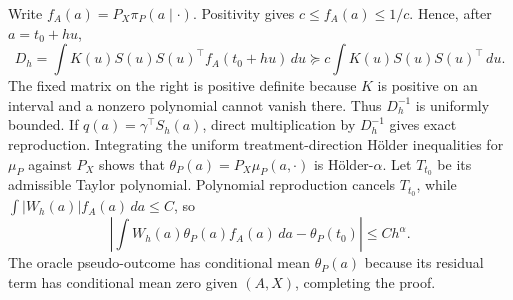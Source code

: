 Write \(f_A(a)=P_X\pi_P(a\mid\cdot)\). Positivity gives \(c\le f_A(a)\le1/c\). Hence, after \(a=t_0+hu\),
\[
D_h=\int K(u)S(u)S(u)^\top f_A(t_0+hu)\,du\succeq c\int K(u)S(u)S(u)^\top\,du.
\]
The fixed matrix on the right is positive definite because \(K\) is positive on an interval and a nonzero polynomial cannot vanish there. Thus \(D_h^{-1}\) is uniformly bounded. If \(q(a)=\gamma^\top S_h(a)\), direct multiplication by \(D_h^{-1}\) gives exact reproduction. Integrating the uniform treatment-direction Hölder inequalities for \(\mu_P\) against \(P_X\) shows that \(\theta_P(a)=P_X\mu_P(a,\cdot)\) is Hölder-\(\alpha\). Let \(T_{t_0}\) be its admissible Taylor polynomial. Polynomial reproduction cancels \(T_{t_0}\), while \(\int\lvert W_h(a)\rvert f_A(a)\,da\le C\), so
\[
\left\lvert\int W_h(a)\theta_P(a)f_A(a)\,da-\theta_P(t_0)\right\rvert
\le Ch^\alpha.
\]
The oracle pseudo-outcome has conditional mean \(\theta_P(a)\) because its residual term has conditional mean zero given \((A,X)\), completing the proof.